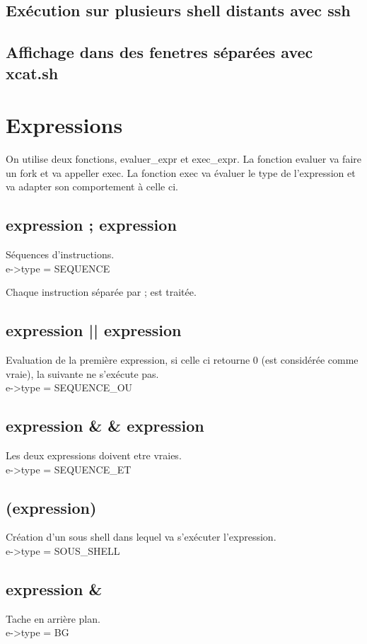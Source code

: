 \documentclass[12pt]{article}
\begin{document}
\subsection{Exécution sur plusieurs shell distants avec ssh}

\subsection{Affichage dans des fenetres séparées avec xcat.sh}

\newpage
\section{Expressions}
On utilise deux fonctions, evaluer\_expr et exec\_expr.
La fonction evaluer va faire un fork et va appeller exec. La fonction exec va évaluer le type de l'expression et va adapter son comportement à celle ci.

\subsection{expression ; expression}
Séquences d'instructions.
\\
e->type = SEQUENCE

Chaque instruction séparée par ; est traitée.

\subsection{expression || expression}
Evaluation de la première expression, si celle ci retourne 0 (est considérée comme vraie), la suivante ne s'exécute pas.
\\
e->type = SEQUENCE\_OU

\subsection{expression \& \& expression}
Les deux expressions doivent etre vraies.
\\
e->type = SEQUENCE\_ET

\subsection{(expression)}
Création d'un sous shell dans lequel va s'exécuter l'expression.
\\
e->type = SOUS\_SHELL

\subsection{expression \&}
Tache en arrière plan.
\\
e->type = BG
\end{document}
